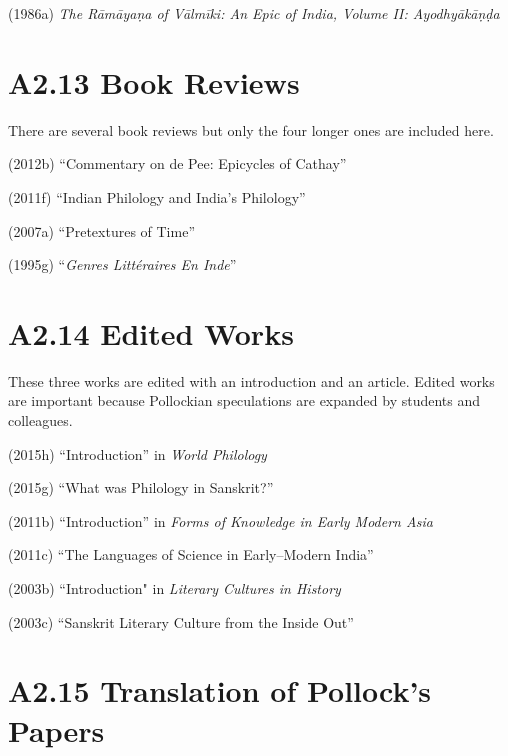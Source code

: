 (1986a) \textit{The Rāmāyaṇa of Vālmīki: An Epic of India, Volume II: Ayodhyākāṇḍa }

\vspace{-.5cm}

\section*{A2.13 Book Reviews}

There are several book reviews but only the four longer ones are included here.

(2012b) “Commentary on de Pee: Epicycles of Cathay”

(2011f) “Indian Philology and India’s Philology”

(2007a) “Pretextures of Time”

(1995g) “\textit{Genres Littéraires En Inde}”


\section*{A2.14 Edited Works}

These three works are edited with an introduction and an article. Edited works are important because Pollockian speculations are expanded by students and colleagues.

(2015h) “Introduction” in \textit{World Philology}

(2015g) “What was Philology in Sanskrit?”

(2011b) “Introduction” in \textit{Forms of Knowledge in Early Modern Asia}

(2011c) “The Languages of Science in Early–Modern India”

(2003b) “Introduction" in \textit{Literary Cultures in History}

(2003c) “Sanskrit Literary Culture from the Inside Out”

\vspace{-.3cm}

\section*{A2.15 Translation of Pollock’s Papers}

